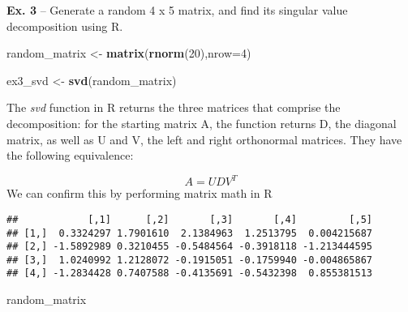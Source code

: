 \documentclass[
]{article}
\newenvironment{Shaded}{\begin{snugshade}}{\end{snugshade}}
\newcommand{\CommentTok}[1]{\textcolor[rgb]{0.56,0.35,0.01}{\textit{#1}}}
\newcommand{\DataTypeTok}[1]{\textcolor[rgb]{0.13,0.29,0.53}{#1}}
\newcommand{\DecValTok}[1]{\textcolor[rgb]{0.00,0.00,0.81}{#1}}
\newcommand{\KeywordTok}[1]{\textcolor[rgb]{0.13,0.29,0.53}{\textbf{#1}}}
\newcommand{\NormalTok}[1]{#1}
\newcommand{\OperatorTok}[1]{\textcolor[rgb]{0.81,0.36,0.00}{\textbf{#1}}}
\newcommand{\StringTok}[1]{\textcolor[rgb]{0.31,0.60,0.02}{#1}}
\begin{document}
\textbf{Ex. 3} -- Generate a random 4 x 5 matrix, and find its singular
value decomposition using R.

\begin{Shaded}
\begin{Highlighting}[]
\NormalTok{random\_matrix \textless{}{-}}\StringTok{ }\KeywordTok{matrix}\NormalTok{(}\KeywordTok{rnorm}\NormalTok{(}\DecValTok{20}\NormalTok{),}\DataTypeTok{nrow=}\DecValTok{4}\NormalTok{)}

\NormalTok{ex3\_svd \textless{}{-}}\StringTok{ }\KeywordTok{svd}\NormalTok{(random\_matrix) }
\end{Highlighting}
\end{Shaded}

The \emph{svd} function in R returns the three matrices that comprise
the decomposition: for the starting matrix A, the function returns D,
the diagonal matrix, as well as U and V, the left and right orthonormal
matrices. They have the following equivalence:

\[A = U D V^T\] We can confirm this by performing matrix math in R

\begin{Shaded}
\end{Shaded}

\begin{verbatim}
##            [,1]      [,2]       [,3]       [,4]         [,5]
## [1,]  0.3324297 1.7901610  2.1384963  1.2513795  0.004215687
## [2,] -1.5892989 0.3210455 -0.5484564 -0.3918118 -1.213444595
## [3,]  1.0240992 1.2128072 -0.1915051 -0.1759940 -0.004865867
## [4,] -1.2834428 0.7407588 -0.4135691 -0.5432398  0.855381513
\end{verbatim}

\begin{Shaded}
\begin{Highlighting}[]
\NormalTok{random\_matrix}
\end{Highlighting}
\end{Shaded}
\end{document}
